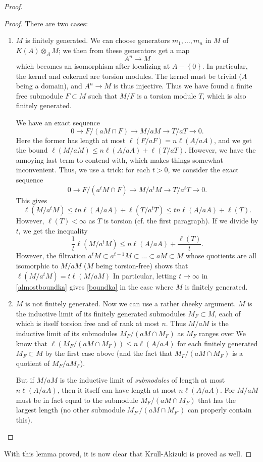 \begin{proof}
\begin{proof}
There are two cases:
\begin{enumerate}
\item $M$ is finitely generated.
We can choose generators $m_1, \dots, m_n$ in $M$ of $K(A) \otimes_A M$; we
then from these generators get a map
\[ A^n \to M  \]
which becomes an isomorphism after localizing at $A - \left\{0\right\} $. In
particular, the kernel and cokernel are torsion modules. The kernel must be trivial
($A$ being a domain), and $A^n \to M$ is thus injective. 
Thus we have found a finite free submodule $F \subset M$ such that $M/F$ is a
torsion module $T$, which is also finitely generated.



We have an exact sequence
\[ 0 \to F/(aM \cap F) \to M/aM \to T/aT \to 0.  \]
Here the former has length at most $\ell(F/aF) = n \ell(A/aA)$, and we get
the bound $\ell(M/aM) \leq n \ell(A/aA) + \ell(T/aT)$. However, we
have the annoying last term to contend with, which makes things somewhat
inconvenient. Thus, we use a trick: for each $t > 0$, we consider the exact
sequence
\[ 0 \to F/(a^tM \cap F) \to M/a^tM \to T/a^tT \to 0.  \]
This gives 
\[ \ell(M/a^t M) \leq t n \ell(A/aA) + \ell(T/a^t T) \leq  t n \ell(A/aA) +
\ell(T). \]
However, $\ell(T) < \infty$ as $T$ is torsion (cf. the first paragraph).
If we divide by $t$, we get the inequality
\begin{equation} \label{almostboundka} \frac{1}{t} \ell(M/a^t M) \leq n
\ell(A/aA) + \frac{\ell(T)}{t}.  \end{equation}
However, the filtration $a^t M \subset a^{t-1}M \subset \dots \subset a M
\subset M$ whose quotients are all isomorphic to $M/aM$ ($M$ being
torsion-free) shows that $\ell(M/a^t M ) = t \ell(M/aM)$
In particular, letting $t \to \infty$ in \eqref{almostboundka} gives
\eqref{boundka} in the case where $M$ is finitely generated.
\item  $M$ is not finitely generated. Now we can use a rather cheeky argument. 
$M$ is the inductive limit of its finitely generated submodules $M_F \subset
M$, each of which
is itself torsion free and of rank at most $n$. Thus $M/aM $ is the inductive limit
of its submodules $M_F/(aM \cap M_F)$ as $M_F$ ranges over 
We know that $\ell(M_F/(aM \cap M_F)) \leq n \ell(A/aA)$ for each finitely
generated $M_F \subset M$ by the first case above (and the fact that
$M_F/(aM \cap M_F)$ is a quotient of $M_F/aM_F$).

But if $M/aM$ is the inductive limit of \emph{submodules} of length at most $n
\ell(A/aA)$, then it itself can have length at most $n \ell(A/aA)$. For $M/aM$
must be in fact equal to the submodule $M_F/(aM \cap M_F)$ that has the
largest length (no other submodule $M_{F'}/(aM \cap M_{F'})$ can properly
contain this).
\end{enumerate}


\end{proof} 

With this lemma proved, it is now clear that Krull-Akizuki is proved as well.

\end{proof} 

